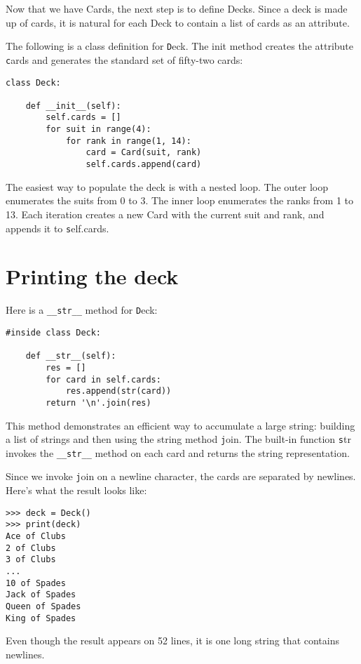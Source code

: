 \documentclass[
DIV=11,
fontsize=12,
twoside,
headinclude=false,
titlepage=firstiscover,
abstract=true,
headsepline=true,
footsepline=true,
chapterprefix=true, %
headings=big,
bibliography=totoc,%
captions=tableheading
]{scrbook}
\theoremstyle{definition}
\begin{document}
Now that we have Cards, the next step is to define Decks.  Since a
deck is made up of cards, it is natural for each Deck to contain a
list of cards as an attribute.

The following is a class definition for {\texttt Deck}.  The
init method creates the attribute {\texttt cards} and generates
the standard set of fifty-two cards:

\begin{lstlisting}
class Deck:

    def __init__(self):
        self.cards = []
        for suit in range(4):
            for rank in range(1, 14):
                card = Card(suit, rank)
                self.cards.append(card)
\end{lstlisting}
%
The easiest way to populate the deck is with a nested loop.  The outer
loop enumerates the suits from 0 to 3.  The inner loop enumerates the
ranks from 1 to 13.  Each iteration
creates a new Card with the current suit and rank,
and appends it to {\texttt self.cards}.


\section{Printing the deck}
\label{printdeck}

Here is a \verb"__str__" method for {\texttt Deck}:

\begin{lstlisting}
#inside class Deck:

    def __str__(self):
        res = []
        for card in self.cards:
            res.append(str(card))
        return '\n'.join(res)
\end{lstlisting}
%
This method demonstrates an efficient way to accumulate a large
string: building a list of strings and then using the string method
{\texttt join}.  The built-in function {\texttt str} invokes the
\verb"__str__" method on each card and returns the string
representation.   
  

Since we invoke {\texttt join} on a newline character, the cards
are separated by newlines.  Here's what the result looks like:

\begin{lstlisting}
>>> deck = Deck()
>>> print(deck)
Ace of Clubs
2 of Clubs
3 of Clubs
...
10 of Spades
Jack of Spades
Queen of Spades
King of Spades
\end{lstlisting}
%
Even though the result appears on 52 lines, it is
one long string that contains newlines.
\end{document}

